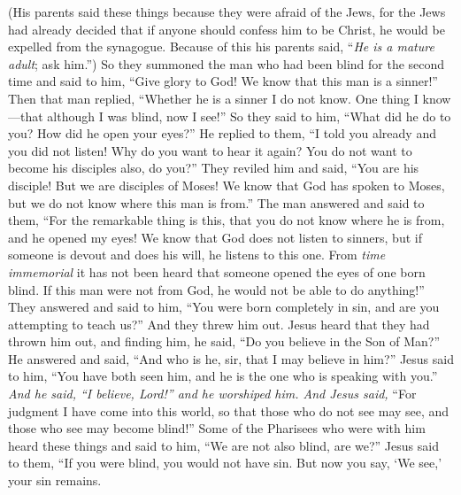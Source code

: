 \begin{biblechapter}
\verse (His parents said these things because they were afraid of the Jews, for the Jews had already decided that if anyone should confess him to be Christ, he would be expelled from the synagogue.
\verse Because of this his parents said, “\textit{He is a mature adult}; ask him.”)
\verse So they summoned the man who had been blind for the second time and said to him, “Give glory to God! We know that this man is a sinner!”
\verse Then that man replied, “Whether he is a sinner I do not know. One thing I know—that although I was blind, now I see!”
\verse So they said to him, “What did he do to you? How did he open your eyes?”
\verse He replied to them, “I told you already and you did not listen! Why do you want to hear it again? You do not want to become his disciples also, do you?”
\verse They reviled him and said, “You are his disciple! But we are disciples of Moses!
\verse We know that God has spoken to Moses, but we do not know where this man is from.”
\verse The man answered and said to them, “For the remarkable thing is this, that you do not know where he is from, and he opened my eyes!
\verse We know that God does not listen to sinners, but if someone is devout and does his will, he listens to this one.
\verse From \textit{time immemorial} it has not been heard that someone opened the eyes of one born blind.
\verse If this man were not from God, he would not be able to do anything!”
\verse They answered and said to him, “You were born completely in sin, and are you attempting to teach us?” And they threw him out.
 Jesus heard that they had thrown him out, and finding him, he said, “Do you believe in the Son of Man?”
\verse He answered and said, “And who is he, sir, that I may believe in him?”
\verse Jesus said to him, “You have both seen him, and he is the one who is speaking with you.”
\verse \textit{And he said, “I believe, Lord!” and he worshiped him.
\verse And Jesus said,} “For judgment I have come into this world, so that those who do not see may see, and those who see may become blind!”
\verse Some of the Pharisees who were with him heard these things and said to him, “We are not also blind, are we?”
\verse Jesus said to them, “If you were blind, you would not have sin. But now you say, ‘We see,’ your sin remains.
\end{biblechapter}


